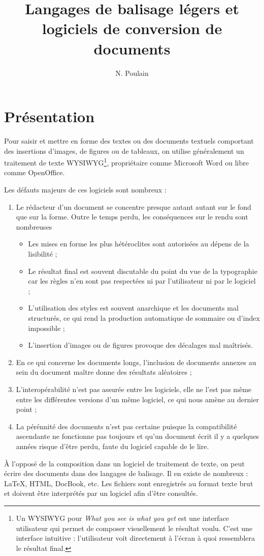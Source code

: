 \documentclass[12pt]{article}
\title{Langages de balisage légers et logiciels de conversion de documents}
\author{N. Poulain}
\begin{document}
\maketitle


\section{Présentation}

Pour saisir et mettre en forme des textes ou des documents textuels
comportant des insertions d'images, de figures ou de tableaux, on
utilise généralement un traitement de texte WYSIWYG\footnote{Un WYSIWYG
  pour \emph{What you see is what you get} est une interface utilisateur
  qui permet de composer visuellement le résultat voulu. C'est une
  interface intuitive : l'utilisateur voit directement à l'écran à quoi
  ressemblera le résultat final.}, propriétaire comme Microsoft Word ou
libre comme OpenOffice.

Les défauts majeurs de ces logiciels sont nombreux :

\begin{enumerate}[1.]
\item
  Le rédacteur d'un document se concentre presque autant autant sur le
  fond que sur la forme. Outre le temps perdu, les conséquences sur le
  rendu sont nombreuses
  \begin{itemize}
  \item
    Les mises en forme les plus hétéroclites sont autorisées au dépens
    de la lisibilité ;
  \item
    Le résultat final est souvent discutable du point du vue de la
    typographie car les règles n'en sont pas respectées ni par
    l'utilisateur ni par le logiciel ;
  \item
    L'utilisation des styles est souvent anarchique et les documents mal
    structurés, ce qui rend la production automatique de sommaire ou
    d'index impossible ;
  \item
    L'insertion d'images ou de figures provoque des décalages mal
    maîtrisés.
  \end{itemize}
\item
  En ce qui concerne les documents longs, l'inclusion de documents
  annexes au sein du document maître donne des résultats aléatoires ;
\item
  L'interopérabilité n'est pas assurée entre les logiciels, elle ne
  l'est pas même entre les différentes versions d'un même logiciel, ce
  qui nous amène au dernier point ;
\item
  La pérénnité des documents n'est pas certaine puisque la compatibilité
  ascendante ne fonctionne pas toujours et qu'un document écrit il y a
  quelques années risque d'être perdu, faute du logiciel capable de le
  lire.
\end{enumerate}
À l'opposé de la composition dans un logiciel de traitement de texte, on
peut écrire des documents dans des langages de balisage. Il en existe de
nombreux : LaTeX, HTML, DocBook, etc. Les fichiers sont enregistrés au
format texte brut et doivent être interprétés par un logiciel afin
d'être consultés.
\end{document}
